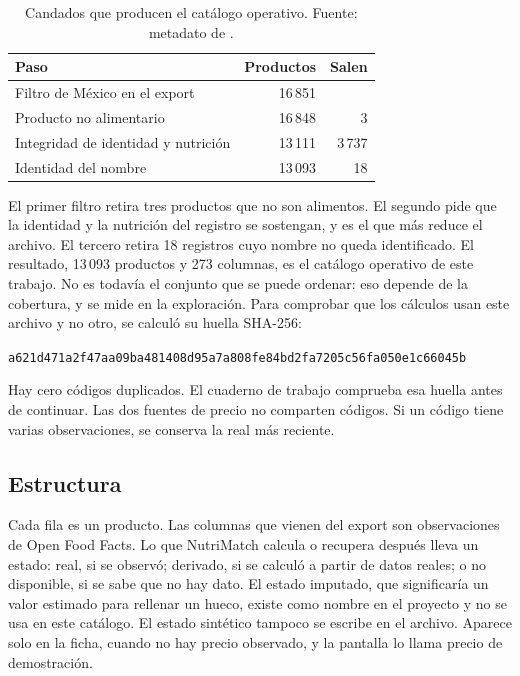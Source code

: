 \begin{table}[ht]
  \centering
  \caption{Candados que producen el catálogo operativo. Fuente: metadato de \archivo.}
  \label{tab:candados}
  \begin{tabular}{lrr}
    \toprule
    Paso & Productos & Salen \\
    \midrule
    Filtro de México en el export & 16\,851 & \\
    Producto no alimentario & 16\,848 & 3 \\
    Integridad de identidad y nutrición & 13\,111 & 3\,737 \\
    Identidad del nombre & 13\,093 & 18 \\
    \bottomrule
  \end{tabular}
\end{table}

El primer filtro retira tres productos que no son alimentos. El segundo pide que la identidad y la nutrición del registro se sostengan, y es el que más reduce el archivo. El tercero retira 18 registros cuyo nombre no queda identificado. El resultado, 13\,093 productos y 273 columnas, es el catálogo operativo de este trabajo. No es todavía el conjunto que se puede ordenar: eso depende de la cobertura, y se mide en la exploración. Para comprobar que los cálculos usan este archivo y no otro, se calculó su huella SHA-256:

\begin{center}
\small\texttt{a621d471a2f47aa09ba481408d95a7a808fe84bd2fa7205c56fa050e1c66045b}
\end{center}

\noindent Hay cero códigos duplicados. El cuaderno de trabajo comprueba esa huella antes de continuar. Las dos fuentes de precio no comparten códigos. Si un código tiene varias observaciones, se conserva la real más reciente.

\subsection{Estructura}

Cada fila es un producto. Las columnas que vienen del export son observaciones de Open Food Facts. Lo que NutriMatch calcula o recupera después lleva un estado: real, si se observó; derivado, si se calculó a partir de datos reales; o no disponible, si se sabe que no hay dato. El estado imputado, que significaría un valor estimado para rellenar un hueco, existe como nombre en el proyecto y no se usa en este catálogo. El estado sintético tampoco se escribe en el archivo. Aparece solo en la ficha, cuando no hay precio observado, y la pantalla lo llama precio de demostración.

